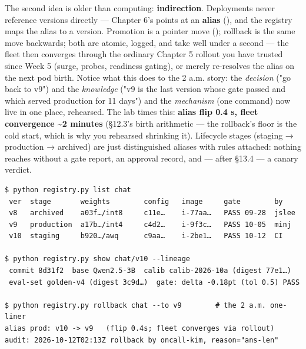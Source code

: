 The second idea is older than computing: \textbf{indirection}. Deployments never reference versions directly — Chapter 6's  points at an \textbf{alias} (), and the registry maps the alias to a version. Promotion is a pointer move (); rollback is the same move backwards; both are atomic, logged, and take well under a second — the fleet then converges through the ordinary Chapter 5 rollout you have trusted since Week 5 (surge, probes, readiness gating), or merely re-resolves the alias on the next pod birth. Notice what this does to the 2 a.m. story: the \textit{decision} ("go back to v9") and the \textit{knowledge} ("v9 is the last version whose gate passed and which served production for 11 days") and the \textit{mechanism} (one command) now live in one place, rehearsed. The lab times this: \textbf{alias flip 0.4 s, fleet convergence \textasciitilde{}2 minutes} (§12.3's birth arithmetic — the rollback's floor is the cold start, which is why you rehearsed shrinking it). Lifecycle stages (staging → production → archived) are just distinguished aliases with rules attached: nothing reaches  without a gate report, an approval record, and — after §13.4 — a canary verdict.

\begin{terminalbox}
\begin{Verbatim}[breaklines=true,breakanywhere=true,fontsize=\small,formatcom=\color{tbbtermfg},codes=\tbbcodeactive]
$ python registry.py list chat
 ver  stage       weights        config   image     gate        by
 v8   archived    a03f…/int8     c11e…    i-77aa…   PASS 09-28  jslee
 v9   production  a17b…/int4     c4d2…    i-9f3c…   PASS 10-05  minj
 v10  staging     b920…/awq      c9aa…    i-2be1…   PASS 10-12  CI

$ python registry.py show chat/v10 --lineage
 commit 8d31f2  base Qwen2.5-3B  calib calib-2026-10a (digest 77e1…)
 eval-set golden-v4 (digest 3c9d…)  gate: delta -0.18pt (tol 0.5) PASS

$ python registry.py rollback chat --to v9        # the 2 a.m. one-liner
alias prod: v10 -> v9   (flip 0.4s; fleet converges via rollout)
audit: 2026-10-12T02:13Z rollback by oncall-kim, reason="ans-len"
\end{Verbatim}
\end{terminalbox}

